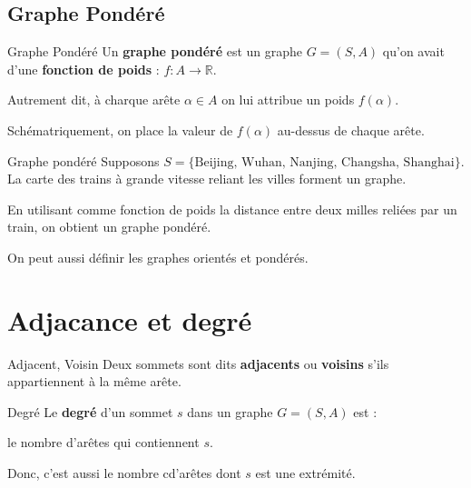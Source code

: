 \subsection{Graphe Pondéré} %

\begin{Definition}[colbacktitle=red!75!black]{Graphe Pondéré}{}
Un \textbf{graphe pondéré} est un graphe $G = (S,A)$ qu'on avait d'une  \textbf{fonction de poids} : $f :A \longrightarrow \mathbb{R}$.

Autrement dit, à charque arête $\alpha \in A$ on lui attribue un poids  $f( \alpha )$.

Schématriquement, on place la valeur de $f( \alpha )$ au-dessus de chaque arête.
\end{Definition}

\begin{Example}{Graphe pondéré}{}
Supposons  $S = \{\text{Beijing, Wuhan, Nanjing, Changsha, Shanghai}\}$. La carte des trains à grande vitesse reliant les villes forment un graphe.

En utilisant comme fonction de poids la distance entre deux milles reliées par un train, on obtient un graphe pondéré.
\end{Example}

On peut aussi définir les graphes orientés et pondérés.

\section{Adjacance et degré}

\begin{Definition}[colbacktitle=red!75!black]{Adjacent, Voisin}{}
Deux sommets sont dits \textbf{adjacents} ou \textbf{voisins} s'ils appartiennent à la même arête.
\end{Definition}


\begin{Definition}[colbacktitle=red!75!black]{Degré}{}
Le \textbf{degré} d'un sommet $s$ dans un graphe $G= (S,A)$ est :
\begin{center}
le nombre d'arêtes qui contiennent $s$.
\end{center}
Donc, c'est aussi le nombre cd'arêtes dont $s$ est une extrémité.
\end{Definition}


